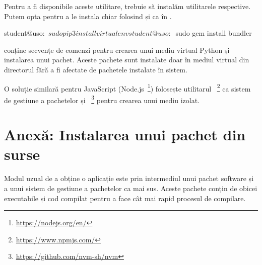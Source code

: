 Pentru a fi disponibile aceste utilitare, trebuie să instalăm utilitarele respective. Putem opta pentru a le instala chiar folosind  și  ca în .

\begin{screen}[caption={Instalarea utilitarelor virtualenv și rvm},label={lst:package:install-venv-bundler}]
student@uso:~$ sudo pip3 install virtualenv

student@uso:~$ sudo gem install bundler
\end{screen}

 conține secvențe de comenzi pentru crearea unui mediu virtual Python și instalarea unui pachet. Aceste pachete sunt instalate doar în mediul virtual din directorul  fără a fi afectate de pachetele instalate în sistem.


O soluție similară pentru JavaScript (Node.js~\footnote{\url{https://nodejs.org/en/}}) folosește utilitarul ~\footnote{\url{https://www.npmjs.com/}} ca sistem de gestiune a pachetelor și ~\footnote{\url{https://github.com/nvm-sh/nvm}} pentru crearea unui mediu izolat.

\section{Anexă: Instalarea unui pachet din surse}
\label{sec:package:source}

Modul uzual de a obține o aplicație este prin intermediul unui pachet software și a unui sistem de gestiune a pachetelor ca mai sus. Aceste pachete conțin de obicei executabile și cod compilat pentru a face cât mai rapid procesul de compilare.

